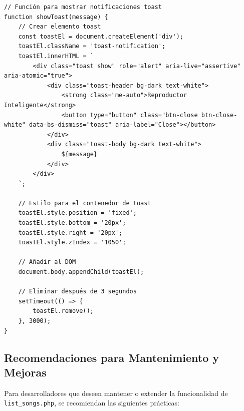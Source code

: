 \documentclass[a4paper,12pt]{article}
\begin{document}
\begin{verbatim}
// Función para mostrar notificaciones toast
function showToast(message) {
    // Crear elemento toast
    const toastEl = document.createElement('div');
    toastEl.className = 'toast-notification';
    toastEl.innerHTML = `
        <div class="toast show" role="alert" aria-live="assertive" aria-atomic="true">
            <div class="toast-header bg-dark text-white">
                <strong class="me-auto">Reproductor Inteligente</strong>
                <button type="button" class="btn-close btn-close-white" data-bs-dismiss="toast" aria-label="Close"></button>
            </div>
            <div class="toast-body bg-dark text-white">
                ${message}
            </div>
        </div>
    `;
    
    // Estilo para el contenedor de toast
    toastEl.style.position = 'fixed';
    toastEl.style.bottom = '20px';
    toastEl.style.right = '20px';
    toastEl.style.zIndex = '1050';
    
    // Añadir al DOM
    document.body.appendChild(toastEl);
    
    // Eliminar después de 3 segundos
    setTimeout(() => {
        toastEl.remove();
    }, 3000);
}
\end{verbatim}

\subsection{Recomendaciones para Mantenimiento y Mejoras}
Para desarrolladores que deseen mantener o extender la funcionalidad de \texttt{list\_songs.php}, se recomiendan las siguientes prácticas:
\end{document}
